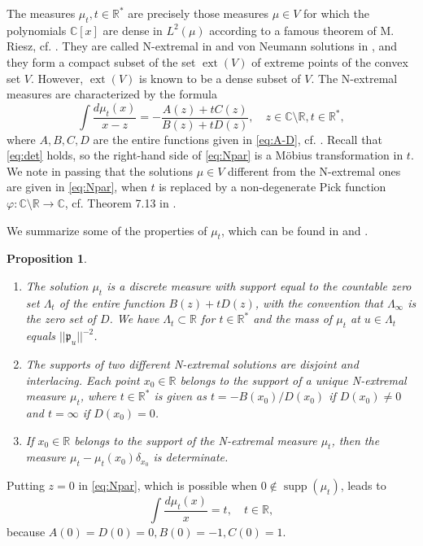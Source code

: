 \documentclass [12pt]{article}
\newtheorem{prop}[thm]{Proposition}
\DeclareMathOperator{\supp}{supp}
\DeclareMathOperator{\ext}{ext}
\newcommand{\C}{\mathbb{C}}
\newcommand{\R}{\mathbb{R}}
\begin{document}
The measures $\mu_t, t\in\R^*$ are precisely those measures $\mu\in V$  for which the polynomials $\C[x]$ are dense in $L^2(\mu)$ according to a famous theorem of M. Riesz, cf. \cite{Ri}.
 They are called N-extremal  in \cite{Ak} and von Neumann solutions in \cite{S}, and they form a compact subset of the set $\ext(V)$ of extreme points of the convex set $V$. However, $\ext(V)$ is known to be a dense subset of $V$.  The N-extremal measures are characterized by the formula
\begin{equation}\label{eq:Npar}
\int\frac{d\mu_t(x)}{x-z}=-\frac{A(z)+tC(z)}{B(z)+tD(z)},\quad z\in \C\setminus\R, t\in\R^*,
\end{equation}
where $A, B, C, D$ are the entire functions given in \eqref{eq:A-D}, cf. \cite[Theorem 7.6]{Sch}. Recall that \eqref{eq:det} holds, so the right-hand side of \eqref{eq:Npar} is a M\"{o}bius transformation in $t$. We note in passing that the solutions $\mu\in V$ different from the N-extremal ones are given in \eqref{eq:Npar}, when $t$ is replaced by a non-degenerate Pick function $\varphi:\C\setminus\R \to\C$, cf. Theorem 7.13 in \cite{Sch}.

We summarize some of the properties of $\mu_t$, which can be found in \cite{Ak} and \cite{Sch}.

\begin{prop}\label{thm:supportNext}
\begin{enumerate}
\item[(i)] The  solution $\mu_t$ is a discrete measure with support equal to the countable zero set $\Lambda_t$ of the entire function $B(z)+tD(z)$, with the convention that $\Lambda_\infty$ is the zero set of $D$. We have $\Lambda_t\subset\R$ for $t\in\R^*$ and
the mass of $\mu_t$ at $u\in\Lambda_t$ equals $||\mathfrak{p}_u||^{-2}$. 
\item[(ii)] The supports of two different N-extremal solutions are disjoint and interlacing. Each point $x_0\in\R$ belongs to the support of a unique N-extremal measure $\mu_t$, where
$t\in\R^*$ is given  as $t=-B(x_0)/D(x_0)$ if $D(x_0)\neq 0$ and $t=\infty$ if $D(x_0)=0$.
\item[(iii)] If $x_0\in\R$ belongs to the support of the N-extremal measure $\mu_t$, then the measure $\mu_t-\mu_t(x_0)\delta_{x_0}$ is determinate.
\end{enumerate}
\end{prop}

Putting $z=0$ in \eqref{eq:Npar}, which is possible when $0\notin \supp(\mu_t)$, leads to
\begin{equation}\label{eq:Npar0}
\int\frac{d\mu_t(x)}{x}=t,\quad t\in\R,
\end{equation}
because $A(0)=D(0)=0, B(0)=-1, C(0)=1$.
\end{document}
